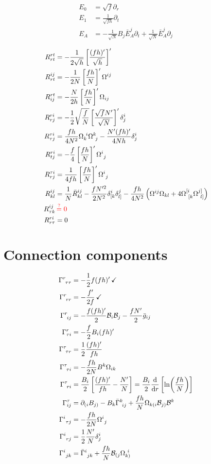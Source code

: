 \begin{align}
  E_0&=\sqrt{f}\partial_r\\
  E_1&=\frac{1}{\sqrt{fh}}\partial_t\\
  E_A&=-\frac{1}{\sqrt{N}}B_j\bar{E}^j_A\partial_t +\frac{1}{\sqrt{N}}\bar{E}^j_A\partial_j
\end{align}

\begin{align}
  R^{rt}_{rt}&=-\frac{1}{2\sqrt{h}}\left[\frac{(fh)'}{\sqrt{h}}\right]'\\
  	R^{ij}_{rt}&=-\frac{1}{2N}\left[\frac{fh}{N}\right]'\Omega^{ij}\\
  	R^{rt}_{ij}&=-\frac{N}{2h}\left[\frac{fh}{N}\right]'\Omega_{ij}\\
  R^{ri}_{rj}&=-\frac{1}{2}\sqrt{\frac{f}{N}}\left[\frac{\sqrt{f}N'}{\sqrt{N}}\right]'\delta^i_j\\
  R^{\tau i}_{\tau j}&=\frac{fh}{4N^2}\Omega_{k}^{~i}\Omega^k_{~j}-\frac{N'(fh)'}{4Nh}\delta^{i}_j\\
  R^{ri}_{tj}&=-\frac{f}{4}\left[\frac{fh}{N}\right]'\Omega^{i}_{~j}\\
  R^{\tau i}_{rj}&=\frac{1}{4fh}\left[\frac{fh}{N}\right]'\Omega^{i}_{~j}\\
  R^{ij}_{kl}&=\frac{1}{N}\bar{R}^{ij}_{kl}-\frac{fN'^2}{2N^2}\delta^{i}_{[k}\delta^j_{l]} -\frac{fh}{4N^2}\left(\Omega^{ij}\Omega_{kl}+4\Omega^{[i}_{~[k}\Omega^{j]}_{~l]}\right)\\
     R^{ij}_{\tau k}&\,\textcolor{red}{\stackrel{?}{=}0}\\
     R^{ri}_{r\tau}&=0
\end{align}

\section{Connection components}
\begin{align}
  \Gamma^r_{~\tau\tau }&=-\frac{1}{2}f(fh)'\,\checkmark\\
  \Gamma^r_{~rr}&=-\frac{f'}{2f}\,\checkmark\\
  \Gamma^{r}_{~ij }&=-\frac{f(fh)'}{2}\mathcal{B}_i\mathcal{B}_j-\frac{fN'}{2}\bar{g}_{ij}\\
  \Gamma^{r}_{\tau i}&=-\frac{f}{2}B_i(fh)'\\
  \Gamma^\tau_{~\tau r}&=\frac{1}{2}\frac{(fh)'}{fh}\\
  \Gamma^\tau_{~\tau i}&=-\frac{fh}{2N}B^k\Omega_{ik}\\
    \Gamma^\tau_{~ri}&=\frac{B_i}{2}\left[\frac{(fh)'}{fh}-\frac{N'}{N}\right]=\frac{B_i}{2}\dv{r}\left[\ln(\frac{fh}{N})\right]\\
   \Gamma^\tau_{ij}&=\partial_{(i}B_{j)}-B_k\bar{\Gamma}^k_{~ij}+\frac{fh}{N}\Omega_{k(i}\mathcal{B}_{j)}\mathcal{B}^k\\
  \Gamma^{i}_{~\tau j}&=-\frac{fh}{2N}\Omega^{i}_{~j}\\
  \Gamma^{i}_{~rj}&=\frac{1}{2}\frac{N'}{N}\delta^{i}_j\\
  \Gamma^{i}_{~jk}&=\bar{\Gamma}^{i}_{~jk}+\frac{fh}{N}\mathcal{B}_{(j}\Omega_{k)}^{~i}
\end{align}

